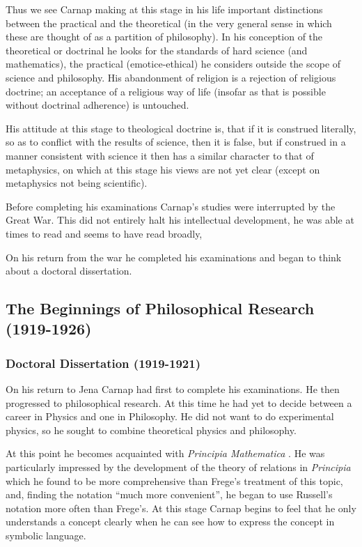 \documentclass[10pt,titlepage]{book}
\begin{document}
Thus we see Carnap making at this stage in his life important distinctions between the practical and the theoretical (in the very general sense in which these are thought of as a partition of philosophy).
In his conception of the theoretical or doctrinal he looks for the standards of hard science (and mathematics), the practical (emotice-ethical) he considers outside the scope of science and philosophy.
His abandonment of religion is a rejection of religious doctrine; an acceptance of a religious way of life (insofar as that is possible without doctrinal adherence) is untouched.

His attitude at this stage to theological doctrine is, that if it is construed literally, so as to conflict with the results of science, then it is false, but if construed in a manner consistent with science it then has a similar character to that of metaphysics, on which at this stage his views are not yet clear (except on metaphysics not being scientific).

Before completing his examinations Carnap's studies were interrupted by the Great War.
This did not entirely halt his intellectual development, he was able at times to read and seems to have read broadly,

On his return from the war he completed his examinations and began to think about a doctoral dissertation.

\subsection{The Beginnings of Philosophical Research (1919-1926)}

\subsubsection{Doctoral Dissertation (1919-1921)}

On his return to Jena Carnap had first to complete his examinations.
He then progressed to philosophical research.
At this time he had yet to decide between a career in Physics and one in Philosophy.
He did not want to do experimental physics, so he sought to combine theoretical physics and philosophy.

At this point he becomes acquainted with \emph{Principia Mathematica} \cite{russell10}.
He was particularly impressed by the development of the theory of relations in \emph{Principia} which he found to be more comprehensive than Frege's treatment of this topic, and, finding the notation ``much more convenient'', he began to use Russell's notation more often than Frege's.
At this stage Carnap begins to feel that he only understands a concept clearly when he can see how to express the concept in symbolic language.
\end{document}
